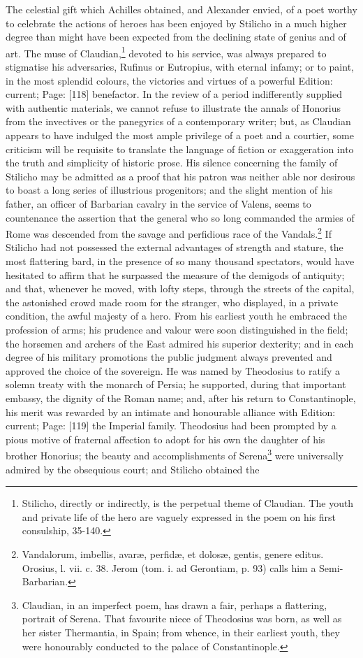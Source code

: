 The celestial gift which Achilles obtained, and Alexander envied, of a poet worthy to celebrate the actions of heroes has been enjoyed by Stilicho in a much higher degree than might have been expected from the declining state of genius and of art. The muse of Claudian,\footnote{Stilicho, directly or indirectly, is the perpetual theme of Claudian. The youth and private life of the hero are vaguely expressed in the poem on his first consulship, 35-140.} devoted to his service, was always prepared to stigmatise his adversaries, Rufinus or Eutropius, with eternal infamy; or to paint, in the most splendid colours, the victories and virtues of a powerful Edition: current; Page: [118] benefactor. In the review of a period indifferently supplied with authentic materials, we cannot refuse to illustrate the annals of Honorius from the invectives or the panegyrics of a contemporary writer; but, as Claudian appears to have indulged the most ample privilege of a poet and a courtier, some criticism will be requisite to translate the language of fiction or exaggeration into the truth and simplicity of historic prose. His silence concerning the family of Stilicho may be admitted as a proof that his patron was neither able nor desirous to boast a long series of illustrious progenitors; and the slight mention of his father, an officer of Barbarian cavalry in the service of Valens, seems to countenance the assertion that the general who so long commanded the armies of Rome was descended from the savage and perfidious race of the Vandals.\footnote{Vandalorum, imbellis, avaræ, perfidæ, et dolosæ, gentis, genere editus. Orosius, l. vii. c. 38. Jerom (tom. i. ad Gerontiam, p. 93) calls him a Semi-Barbarian.} If Stilicho had not possessed the external advantages of strength and stature, the most flattering bard, in the presence of so many thousand spectators, would have hesitated to affirm that he surpassed the measure of the demigods of antiquity; and that, whenever he moved, with lofty steps, through the streets of the capital, the astonished crowd made room for the stranger, who displayed, in a private condition, the awful majesty of a hero. From his earliest youth he embraced the profession of arms; his prudence and valour were soon distinguished in the field; the horsemen and archers of the East admired his superior dexterity; and in each degree of his military promotions the public judgment always prevented and approved the choice of the sovereign. He was named by Theodosius to ratify a solemn treaty with the monarch of Persia; he supported, during that important embassy, the dignity of the Roman name; and, after his return to Constantinople, his merit was rewarded by an intimate and honourable alliance with Edition: current; Page: [119] the Imperial family. Theodosius had been prompted by a pious motive of fraternal affection to adopt for his own the daughter of his brother Honorius; the beauty and accomplishments of Serena\footnote{Claudian, in an imperfect poem, has drawn a fair, perhaps a flattering, portrait of Serena. That favourite niece of Theodosius was born, as well as her sister Thermantia, in Spain; from whence, in their earliest youth, they were honourably conducted to the palace of Constantinople.} were universally admired by the obsequious court; and Stilicho obtained the 